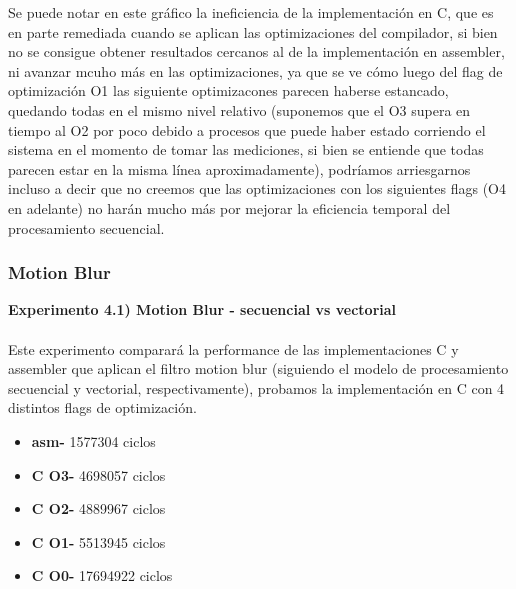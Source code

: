 \documentclass[a4paper]{article}
\begin{document}
Se puede notar en este gr\'{a}fico la ineficiencia de la implementaci\'{o}n en C, que es en parte remediada cuando se aplican las optimizaciones del compilador, si bien no se consigue obtener resultados cercanos al de la implementaci\'{o}n en assembler, ni avanzar mcuho m\'{a}s en las optimizaciones, ya que se ve c\'{o}mo luego del flag de optimizaci\'{o}n O1 las siguiente optimizacones parecen haberse estancado, quedando todas en el mismo nivel relativo (suponemos que el O3 supera en tiempo al O2 por poco debido a procesos que puede haber estado corriendo el sistema en el momento de tomar las mediciones, si bien se entiende que todas parecen estar en la misma l\'{i}nea aproximadamente), podr\'{i}amos arriesgarnos incluso a decir que no creemos que las optimizaciones con los siguientes flags (O4 en adelante) no har\'{a}n mucho m\'{a}s por mejorar la eficiencia temporal del procesamiento secuencial.

\newpage

\subsubsection{Motion Blur}

\textbf{Experimento 4.1) Motion Blur - secuencial vs vectorial}\\ \\

Este experimento comparar\'{a} la performance de las implementaciones C y assembler que aplican el filtro motion blur (siguiendo el modelo de procesamiento secuencial y vectorial, respectivamente), probamos la implementaci\'{o}n en C con 4 distintos flags de optimizaci\'{o}n.

\begin{itemize}

\item \textbf{asm-}  1577304 ciclos
\item \textbf{C O3-} 4698057 ciclos\\
\item \textbf{C O2-} 4889967 ciclos\\
\item \textbf{C O1-} 5513945 ciclos\\
\item \textbf{C O0-} 17694922 ciclos\\\\ \\ \\

\end{itemize}
\end{document}
